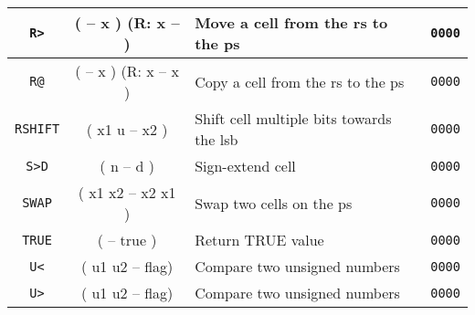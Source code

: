 \begin{center}
\begin{longtable}{|c|c|l|c|}
                                              
      \texttt{R>}                             &
      ( -- x ) (R: x -- )                     &
      Move a cell from the \gls{rs} to the \gls{ps} &
      \texttt{0000}                           \\ \hline
                                                         
      \texttt{R@}                             &
      ( -- x ) (R: x -- x )                   &
      Copy a cell from the \gls{rs} to the \gls{ps} &
      \texttt{0000}                           \\ \hline
                                                         
      \texttt{RSHIFT}                         &
      ( x1 u -- x2 )                          &
      Shift cell multiple bits towards the \gls{lsb} &
      \texttt{0000}                           \\ \hline

      \texttt{S>D}                            &
      ( n -- d )                              &
      Sign-extend cell                        &
      \texttt{0000}                           \\ \hline

      \texttt{SWAP}                           &
      ( x1 x2 -- x2 x1 )                      &
      Swap two cells on the \gls{ps}          &
      \texttt{0000}                           \\ \hline

      \texttt{TRUE}                           &
      ( -- true )                             &
      Return TRUE value                       &
      \texttt{0000}                           \\ \hline
                              
      \texttt{U<}                             &
      ( u1 u2 -- flag)                        &
      Compare two unsigned numbers            &
      \texttt{0000}                           \\ \hline
                              
      \texttt{U>}                             &
      ( u1 u2 -- flag)                        &
      Compare two unsigned numbers            &
      \texttt{0000}                           \\ \hline


\end{longtable}
\end{center}

